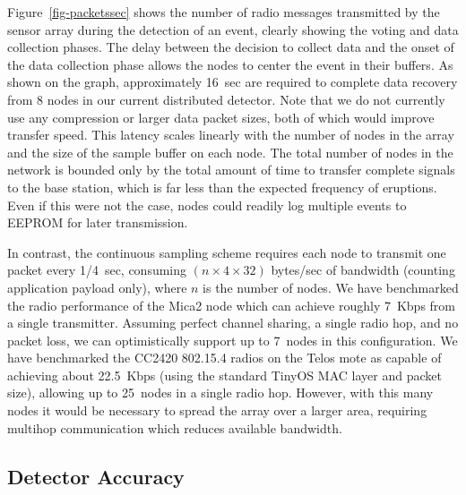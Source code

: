 Figure~\ref{fig-packetssec} shows the number of radio messages 
transmitted by the sensor array during the detection
of an event, clearly showing the voting and data collection phases.
The delay between the decision to collect data and the onset of the data
collection phase allows the nodes to center the event in their buffers.  As
shown on the graph, approximately 16~sec are required to complete data
recovery from 8 nodes in our current distributed detector. Note that we do
not currently use any compression or larger data packet sizes, 
both of which would improve transfer speed. This latency scales
linearly with the number of nodes in the array and the size of the sample
buffer on each node. The total
number of nodes in the network is bounded only by the total amount of
time to transfer complete signals to the base station, which is far
less than the expected frequency of eruptions. Even if this were not 
the case, nodes could readily log multiple events to EEPROM for later
transmission.

In contrast, the continuous sampling scheme requires each node to
transmit one packet every 1/4~sec, consuming $(n \times 4 \times 32)$
bytes/sec of bandwidth (counting application payload only), 
where $n$ is the number of nodes. 
We have benchmarked the radio performance of the Mica2 node which can
achieve roughly 7~Kbps from a single transmitter. Assuming perfect
channel sharing, a single radio hop, and no packet loss, we can optimistically 
support up to 7~nodes in this configuration. 
We have benchmarked the CC2420 802.15.4 radios on the Telos mote as 
capable of achieving about 22.5~Kbps (using the standard TinyOS MAC layer
and packet size), allowing up to 25~nodes in a single radio hop. 
However, with this many nodes it would be necessary to spread the array
over a larger area, requiring multihop communication which reduces
available bandwidth.

\subsection{Detector Accuracy}

